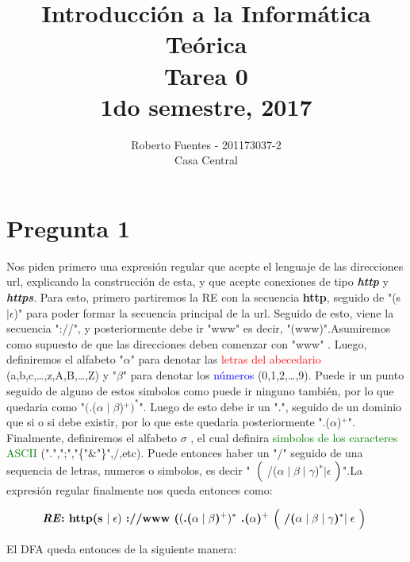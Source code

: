 \documentclass[spanish, fleqn]{article}
\author{
	 Roberto Fuentes - 201173037-2 \\
	Casa Central\\
	}
\title{
\textbf{Introducción a la Informática Teórica}\\
Tarea 0\\
1do semestre, 2017 
}
\begin{document}
\maketitle


\section*{Pregunta 1}

 Nos piden primero una expresión regular que acepte el lenguaje de las direcciones url, explicando la construcción de esta, y que acepte conexiones de tipo \textit{\textbf{http}} y \textit{\textbf{https}}. Para esto, primero partiremos la RE con la secuencia \textbf{http}, seguido de "(s $\mid\epsilon$)" para poder formar la secuencia principal de la url. Seguido de esto, viene la secuencia "://", y posteriormente debe ir "www" es decir, "(www)".Asumiremos como supuesto de que las direcciones deben comenzar con "www" .  Luego, definiremos el alfabeto "$\alpha$" para denotar las \textcolor{red}{letras del abecedario} (a,b,c,\ldots,z,A,B,\ldots,Z) y "$\beta$" para denotar los \textcolor{blue}{números} (0,1,2,\ldots,9). Puede ir un punto seguido de alguno de estos simbolos como puede ir ninguno también, por lo que quedaria como "$(\text{.}$($\alpha\mid\beta$)$^{+})^*$".
 Luego de esto debe ir un ".", seguido de un dominio que si o si debe existir, por lo que este quedaria posteriormente ".($\alpha$)$^{+}$". Finalmente, definiremos el alfabeto $\sigma$ , el cual definira \textcolor{green}{simbolos de los caracteres ASCII} (".",";","\{"\&"\}",$/$,etc). Puede entonces haber un "/" seguido de una sequencia de letras, numeros o simbolos, es decir "\ $\Bigl($ /($\alpha\mid\beta\mid\gamma$)$^{*}$$\mid\epsilon$ $ \Bigl)$".La expresión regular finalmente nos queda entonces como:
 
 
 $$\textbf{\textit{RE}: http(s $\mid\epsilon)$ ://www ($(\text{.}$($\alpha\mid\beta$)$^{+})^*$ .($\alpha$)$^+$ $\Bigl($ /($\alpha\mid\beta\mid\gamma$)$^{*}$$\mid\epsilon$ $ \Bigl)$  }$$

El DFA queda entonces de la siguiente manera:
\newpage
\end{document}
